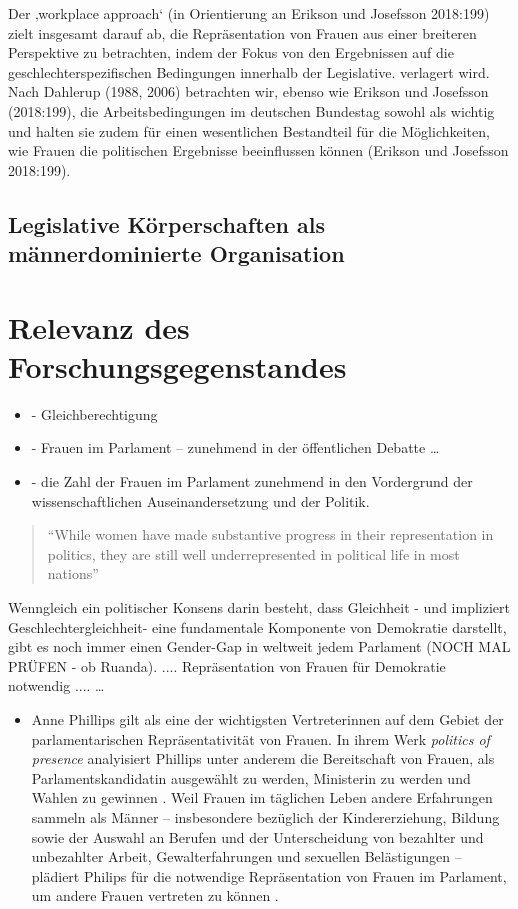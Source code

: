 \documentclass[12pt, 
    twoside=false, 
    bibliography=totoc, 
    numbers=endperiod, 
    headings=normal, 
    toc=chapterentrydotfill
    ]{scrbook}
\begin{document}
Der ‚workplace approach‘ (in Orientierung an Erikson und Josefsson 2018:199) zielt insgesamt darauf ab, die Repräsentation von Frauen aus einer breiteren Perspektive zu betrachten, indem der Fokus von den Ergebnissen auf die geschlechterspezifischen Bedingungen innerhalb der Legislative. verlagert wird. Nach Dahlerup (1988, 2006) betrachten wir, ebenso wie Erikson und Josefsson (2018:199), die Arbeitsbedingungen im deutschen Bundestag sowohl als wichtig und halten sie zudem für einen wesentlichen Bestandteil für die Möglichkeiten, wie Frauen die politischen Ergebnisse beeinflussen können (Erikson und Josefsson 2018:199). 

\section{Legislative Körperschaften als männerdominierte Organisation }




\chapter{Relevanz des Forschungsgegenstandes}

\begin{itemize}
\item - Gleichberechtigung
\item -  Frauen im Parlament – zunehmend in der öffentlichen Debatte … 
\item -  die Zahl der Frauen im Parlament zunehmend in den Vordergrund der wissenschaftlichen Auseinandersetzung und der Politik. 
\end{itemize}

\begin{quote}
    \enquote{While women have made substantive progress in their representation in politics, they are still well underrepresented in political life in most nations} \parencite[2]{coffe_2013}
\end{quote}

Wenngleich ein politischer Konsens darin besteht, dass Gleichheit - und impliziert Geschlechtergleichheit- eine fundamentale Komponente von Demokratie darstellt, gibt es noch immer einen Gender-Gap in weltweit jedem Parlament (NOCH MAL PRÜFEN - ob Ruanda).  .... Repräsentation von Frauen für Demokratie notwendig .... 
…
\begin{itemize}
\item Anne Phillips gilt als eine der wichtigsten Vertreterinnen auf dem Gebiet der parlamentarischen Repräsentativität von Frauen. In ihrem Werk \emph{politics of presence} \parencite*{phillips_1998} analyisiert Phillips unter anderem die Bereitschaft von Frauen, als Parlamentskandidatin ausgewählt zu werden, Ministerin zu werden und Wahlen zu gewinnen \parencite[vgl.][416f.]{blaxill_2016}. 
Weil Frauen im täglichen Leben andere Erfahrungen sammeln als Männer -- insbesondere bezüglich der Kindererziehung, Bildung sowie der Auswahl an Berufen und der Unterscheidung von bezahlter und unbezahlter Arbeit, Gewalterfahrungen und sexuellen Belästigungen -- plädiert Philips für die notwendige Repräsentation von Frauen im Parlament, um andere Frauen vertreten zu können \parencite[vgl.][52]{wangnerud_2009}.
\end{itemize}
\end{document}
